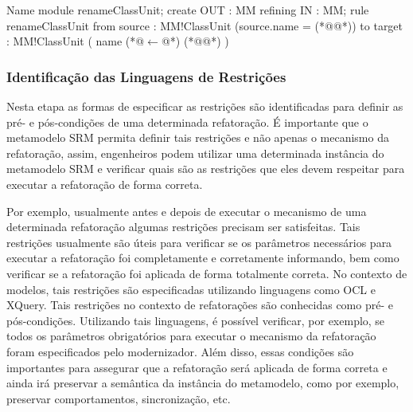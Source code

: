\begin{codigo}[caption={[Refatoração \textit{Rename ClassUnit}.] Refatoração \textit{Rename ClassUnit}.},escapeinside={(*@}{@*)}, basicstyle=\footnotesize, label={codigo:rename_classUnit_SRM}, language=ATL]{Name}
module renameClassUnit;
create OUT : MM refining IN : MM;
rule renameClassUnit {
	from
		source : MM!ClassUnit (source.name = (*@@*))
	to 
		target : MM!ClassUnit (
			name (*@$\leftarrow$@*) (*@@*)
		)
}
\end{codigo}




\subsubsection{Identificação das Linguagens de Restrições}
Nesta etapa as formas de especificar as restrições são identificadas para definir as pré- e pós-condições de uma determinada refatoração. É importante que o metamodelo SRM permita definir tais restrições e não apenas o mecanismo da refatoração, assim, engenheiros podem utilizar uma determinada instância do metamodelo SRM e verificar quais são as restrições que eles devem respeitar para executar a refatoração de forma correta. 

Por exemplo, usualmente antes e depois de executar o mecanismo de uma determinada refatoração algumas restrições precisam ser satisfeitas. Tais restrições usualmente são úteis para verificar se os parâmetros necessários para executar a refatoração foi completamente e corretamente informando, bem como verificar se a refatoração foi aplicada de forma totalmente correta. No contexto de modelos, tais restrições são especificadas utilizando linguagens como OCL e XQuery. Tais restrições no contexto de refatorações são conhecidas como pré- e pós-condições. Utilizando tais linguagens, é possível verificar, por exemplo, se todos os parâmetros obrigatórios para executar o mecanismo da refatoração foram especificados pelo modernizador. Além disso, essas condições são importantes para assegurar que a refatoração será aplicada de forma correta e ainda irá preservar a semântica da instância do metamodelo, como por exemplo, preservar comportamentos, sincronização, etc. 

